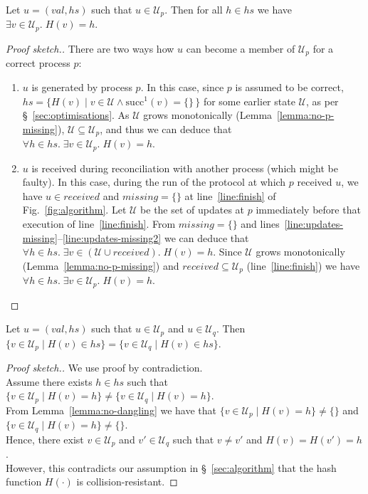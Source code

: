 \documentclass[manuscript,anonymous]{acmart}
\begin{document}
\begin{lemma}\label{lemma:no-dangling}
Let $u = (\mathit{val}, \mathit{hs})$ such that $u \in \mathcal{U}_p$.
Then for all $h \in \mathit{hs}$ we have $\exists v \in \mathcal{U}_p.\; H(v) = h$.
\end{lemma}
\begin{proof}[Proof sketch.]
There are two ways how $u$ can become a member of $\mathcal{U}_p$ for a correct process $p$:
\begin{enumerate}
    \item $u$ is generated by process $p$.
    In this case, since $p$ is assumed to be correct, $\mathit{hs} = \{H(v) \mid v \in \mathcal{U} \wedge \mathrm{succ}^1(v) = \{\}\,\}$ for some earlier state $\mathcal{U}$, as per \S~\ref{sec:optimisations}.
    As $\mathcal{U}$ grows monotonically (Lemma~\ref{lemma:no-p-missing}), $\mathcal{U} \subseteq \mathcal{U}_p$, and thus we can deduce that $\forall h \in \mathit{hs}.\; \exists v \in \mathcal{U}_p.\; H(v) = h$.
    \item $u$ is received during reconciliation with another process (which might be faulty).
    In this case, during the run of the protocol at which $p$ received $u$, we have $u \in \mathit{received}$ and $\mathit{missing} = \{\}$ at line~\ref{line:finish} of Fig.~\ref{fig:algorithm}.
    Let $\mathcal{U}$ be the set of updates at $p$ immediately before that execution of line~\ref{line:finish}.
    From $\mathit{missing} = \{\}$ and lines~\ref{line:updates-missing}--\ref{line:updates-missing2} we can deduce that $\forall h \in \mathit{hs}.\; \exists v \in (\mathcal{U} \cup \mathit{received}).\; H(v) = h$.
    Since $\mathcal{U}$ grows monotonically (Lemma~\ref{lemma:no-p-missing}) and $\mathit{received} \subseteq \mathcal{U}_p$ (line~\ref{line:finish}) we have $\forall h \in \mathit{hs}.\; \exists v \in \mathcal{U}_p.\; H(v) = h$.
\end{enumerate}
\end{proof}

\begin{lemma}\label{lemma:no-collision}
Let $u = (\mathit{val}, \mathit{hs})$ such that $u \in \mathcal{U}_p$ and $u \in \mathcal{U}_q$.
Then $\{v \in \mathcal{U}_p \mid H(v) \in \mathit{hs}\} = \{v \in \mathcal{U}_q \mid H(v) \in \mathit{hs}\}$.
\end{lemma}
\begin{proof}[Proof sketch.]
We use proof by contradiction.\\
Assume there exists $h \in \mathit{hs}$ such that $\{v \in \mathcal{U}_p \mid H(v) = h\} \neq \{v \in \mathcal{U}_q \mid H(v) = h\}$.\\
From Lemma~\ref{lemma:no-dangling} we have that $\{v \in \mathcal{U}_p \mid H(v) = h\} \neq \{\}$ and $\{v \in \mathcal{U}_q \mid H(v) = h\} \neq \{\}$.\\
Hence, there exist $v \in \mathcal{U}_p$ and $v' \in \mathcal{U}_q$ such that $v \neq v'$ and $H(v) = H(v') = h$.\\
However, this contradicts our assumption in \S~\ref{sec:algorithm} that the hash function $H(\cdot)$ is collision-resistant.
\end{proof}
\end{document}
